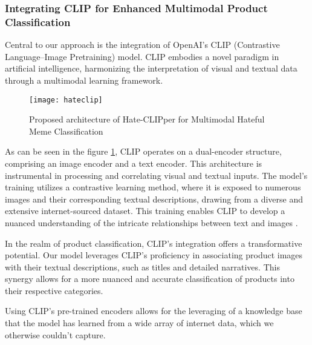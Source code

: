 \subsubsection{Integrating CLIP for Enhanced Multimodal Product Classification}
Central to our approach is the integration of OpenAI's CLIP (Contrastive Language–Image Pretraining) model. CLIP embodies a novel paradigm in artificial intelligence, harmonizing the interpretation of visual and textual data through a multimodal learning framework.

\begin{figure}[H]
	\centering
	\texttt{[image: hateclip]}
	\caption{Proposed architecture of Hate-CLIPper for Multimodal Hateful Meme Classification \cite{radford-2021}}
	\label{fig:architecture}
\end{figure}

As can be seen in the figure \ref{fig:architecture}, CLIP operates on a dual-encoder structure, comprising an image encoder and a text encoder. This architecture is instrumental in processing and correlating visual and textual inputs. The model's training utilizes a contrastive learning method, where it is exposed to numerous images and their corresponding textual descriptions, drawing from a diverse and extensive internet-sourced dataset. This training enables CLIP to develop a nuanced understanding of the intricate relationships between text and images \cite{radford-2021}.

In the realm of product classification, CLIP's integration offers a transformative potential. Our model leverages CLIP's proficiency in associating product images with their textual descriptions, such as titles and detailed narratives. This synergy allows for a more nuanced and accurate classification of products into their respective categories.

Using CLIP's pre-trained encoders allows for the leveraging of a knowledge base that the model has learned from a wide array of internet data, which we otherwise couldn't capture. 

